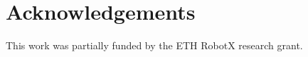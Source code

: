 \section{Acknowledgements}
\label{sec:acknowledgements}

This work was partially funded by the ETH RobotX research grant.